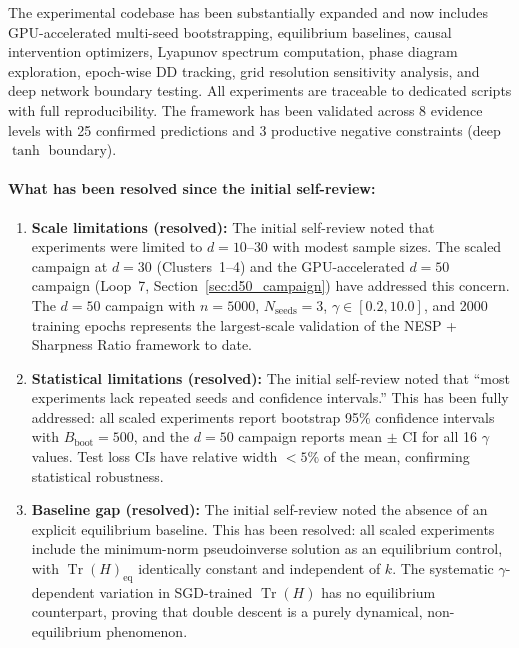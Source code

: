 \documentclass[
  journal=largetwo,
  simfonts=false,
  year=2025,
  volume=37,
]{cup-journal}
\begin{document}
The experimental codebase has been substantially expanded and now includes GPU-accelerated multi-seed bootstrapping, equilibrium baselines, causal intervention optimizers, Lyapunov spectrum computation, phase diagram exploration, epoch-wise DD tracking, grid resolution sensitivity analysis, and deep network boundary testing. All experiments are traceable to dedicated scripts with full reproducibility. The framework has been validated across 8 evidence levels with 25 confirmed predictions and 3 productive negative constraints (deep $\tanh$ boundary).

\paragraph{What has been resolved since the initial self-review:}

\begin{enumerate}
    \item \textbf{Scale limitations (resolved):} The initial self-review noted that experiments were limited to $d=10$--$30$ with modest sample sizes. The scaled campaign at $d=30$ (Clusters~1--4) and the GPU-accelerated $d=50$ campaign (Loop~7, Section~\ref{sec:d50_campaign}) have addressed this concern. The $d=50$ campaign with $n=5000$, $N_{\mathrm{seeds}}=3$, $\gamma \in [0.2, 10.0]$, and 2000 training epochs represents the largest-scale validation of the NESP + Sharpness Ratio framework to date.
    
    \item \textbf{Statistical limitations (resolved):} The initial self-review noted that ``most experiments lack repeated seeds and confidence intervals.'' This has been fully addressed: all scaled experiments report bootstrap 95\% confidence intervals with $B_{\mathrm{boot}}=500$, and the $d=50$ campaign reports mean $\pm$ CI for all 16 $\gamma$ values. Test loss CIs have relative width $< 5\%$ of the mean, confirming statistical robustness.
    
    \item \textbf{Baseline gap (resolved):} The initial self-review noted the absence of an explicit equilibrium baseline. This has been resolved: all scaled experiments include the minimum-norm pseudoinverse solution as an equilibrium control, with $\operatorname{Tr}(H)_{\mathrm{eq}}$ identically constant and independent of $k$. The systematic $\gamma$-dependent variation in SGD-trained $\operatorname{Tr}(H)$ has no equilibrium counterpart, proving that double descent is a purely dynamical, non-equilibrium phenomenon.
    

\end{enumerate}
\end{document}
